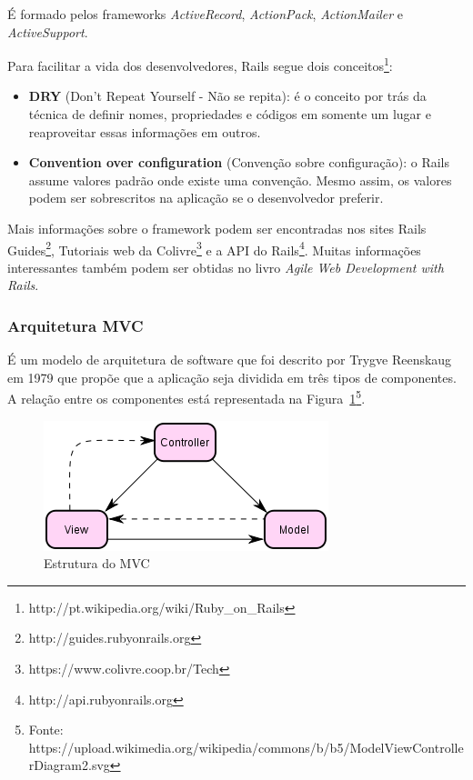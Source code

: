 \documentclass[[a4paper,11pt]{article}
\begin{document}
É formado pelos frameworks {\it ActiveRecord}, {\it ActionPack},
{\it ActionMailer} e {\it ActiveSupport}.

Para facilitar a vida dos desenvolvedores, Rails segue dois
conceitos\footnote{http://pt.wikipedia.org/wiki/Ruby\_on\_Rails}:

\begin{itemize}
  \item \textbf{DRY} (Don't Repeat Yourself - Não se repita): é o
conceito por trás da técnica de definir nomes, propriedades e códigos em
somente um lugar e reaproveitar essas informações em outros.
  \item \textbf{Convention over configuration} (Convenção sobre
configuração): o Rails assume valores padrão onde existe uma convenção.
Mesmo assim, os valores podem ser sobrescritos na aplicação se o
desenvolvedor preferir.
\end{itemize}

Mais informações sobre o framework podem ser encontradas nos sites
Rails Guides\footnote{http://guides.rubyonrails.org},
Tutoriais web da Colivre\footnote{https://www.colivre.coop.br/Tech} e a
API do Rails\footnote{http://api.rubyonrails.org}. Muitas informações
interessantes também podem ser obtidas no livro {\it Agile Web Development
with Rails}.

\subsubsection{Arquitetura MVC}

É um modelo de arquitetura de software que foi descrito por Trygve
Reenskaug em 1979 que propõe que a aplicação seja dividida em três
tipos de componentes. A relação entre os componentes está representada
na Figura~\ref{fig:estrutura-mvc}\footnote{Fonte:
https://upload.wikimedia.org/wikipedia/commons/b/b5/ModelViewControllerDiagram2.svg}.

\begin{figure}[h]
\center
\includegraphics[scale=0.6]{mvc.png}
\caption{Estrutura do MVC}
\label{fig:estrutura-mvc}
\end{figure}
\end{document}
